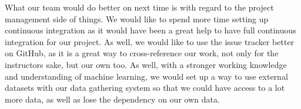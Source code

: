 \documentclass{article}
\begin{document}
What our team would do better on next time is with regard to the project management side of things. We would like to spend more time setting up continuous integration as it would have been a great help to have full continuous integration for our project. As well, we would like to use the issue tracker better on GitHub, as it is a great way to cross-reference our work, not only for the instructors sake, but our own too. As well, with a stronger working knowledge and understanding of machine learning, we would set up a way to use external datasets with our data gathering system so that we could have access to a lot more data, as well as lose the dependency on our own data.
\end{document}
